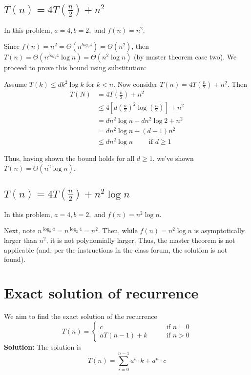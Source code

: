 \documentclass[paper=a4, fontsize=11pt]{scrartcl} %
\numberwithin{equation}{section} %
\numberwithin{figure}{section} %
\numberwithin{table}{section} %
\begin{document}
\subsection{$T(n) = 4 T\left(\frac{n}{2}\right) + n^2$}

In this problem, $a = 4, b = 2, $ and $f(n) = n^2$.

Since $f(n) = n^2 = \Theta(n^{log_{2} 4 }) = \Theta(n^2)$, then $T(n) = \Theta(n^{log_{2} 4} \log n) = \Theta(n^2 \log n)$ (by master theorem case two). We proceed to prove this bound using substitution:

Assume $T(k) \leq d k^{2} \log k$ for $k < n$. Now consider $T(n) = 4 T\left(\frac{n}{2}\right) + n^2$. Then
\begin{align*}
T(N) &= 4 T\left(\frac{n}{2}\right) + n^2\\
	&\leq 4 \left[d \left(\frac{n}{2}\right)^{2} \log \left(\frac{n}{2}\right)\right] + n^2\\
	&= d n^2 \log n - d n^2 \log 2 + n^2 \\
	&= d n^2 \log n - (d - 1)n^2 \\
	&\leq d n^2 \log n \qquad{} \textrm{ if } d\geq1
\end{align*}

Thus, having shown the bound holds for all $d\geq 1$, we've shown $T(n) = \Theta(n^2 \log n)$.

\subsection{$T(n) = 4 T\left(\frac{n}{2}\right) + n^2\log n$}

In this problem, $a = 4, b = 2, $ and $f(n) = n^2\log n$.

Next, note $n^{\log_b a} = n^{\log_2 4} = n^2$. Then, while $f(n) = n^2 \log n$ is asymptotically larger than $n^2$, it is not polynomially larger. Thus, the master theorem is not applicable (and, per the instructions in the class forum, the solution is not found).


\section{Exact solution of recurrence}

We aim to find the exact solution of the recurrence
\[
T(n) =
\begin{cases}
c & \qquad{} \textrm{if } n=0\\
aT(n-1) + k & \qquad{} \textrm{if } n>0
\end{cases}
\]
\textbf{Solution:}
The solution is
\[T(n) = \sum_{i = 0}^{n-1} a^i \cdot k + a^n \cdot c\]
\end{document}

